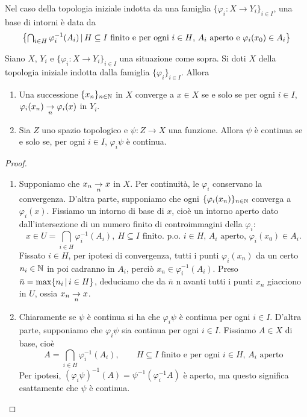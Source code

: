 Nel caso della topologia iniziale indotta da una famiglia $\{\varphi_i : X \to Y_i\}_{i \in I}$, una base di intorni è data da
\begin{equation}
\label{eq:neigh_basis}
	\left\{ {\textstyle \bigcap_{i \in H} \varphi_i^{-1}(A_i)} \suchthat \text{$H \subseteq I$ finito e per ogni $i \in H$, $A_i$ aperto e $\varphi_i(x_0) \in A_i$} \right\}
\end{equation}

\begin{theorem}
\label{th:weak_conv_and_cont}
	Siano $X$, $Y_i$ e $\{\varphi_i : X \to Y_i\}_{i \in I}$ una situazione come sopra. Si doti $X$ della topologia iniziale indotta dalla famiglia $\{\varphi_i\}_{i \in I}$.
	Allora
	\begin{enumerate}
		\item Una successione $\{x_n\}_{n \in \N}$ in $X$ converge a $x \in X$ se e solo se per ogni $i \in I$, $\varphi_i(x_n) \conv[n] \varphi_i(x)$ in $Y_i$.
		\item Sia $Z$ uno spazio topologico e $\psi : Z \to X$ una funzione.
		Allora $\psi$ è continua se e solo se, per ogni $i \in I$, $\varphi_i\psi$ è continua.
	\end{enumerate}
\end{theorem}
\begin{proof}
	\leavevmode
	\begin{enumerate}
		\item Supponiamo che $x_n \conv[n] x$ in $X$. Per continuità, le $\varphi_i$ conservano la convergenza. D'altra parte, supponiamo che ogni $\{\varphi_i(x_n)\}_{n \in \N}$ converga a $\varphi_i(x)$. Fissiamo un intorno di base di $x$, cioè un intorno aperto dato dall'intersezione di un numero finito di controimmagini della $\varphi_i$:
		\begin{equation*}
			x \in U=\bigcap_{i \in H} \varphi_i^{-1}(A_i), \ \text{$H \subseteq I$ finito. p.o. $i \in H$, $A_i$ aperto, $\varphi_i(x_0) \in A_i$}.
		\end{equation*}
		Fissato $i \in H$, per ipotesi di convergenza, tutti i punti $\varphi_i(x_n)$ da un certo $n_i \in \N$ in poi cadranno in $A_i$, perciò $x_n \in \varphi_i^{-1}(A_i)$. Preso $\bar n = \max \{n_i \suchthat i \in H\}$, deduciamo che da $\bar n$ n avanti tutti i punti $x_n$ giacciono in $U$, ossia $x_n \conv[n] x$.
		\item Chiaramente se $\psi$ è continua si ha che $\varphi_i \psi$ è continua per ogni $i \in I$. D'altra parte, supponiamo che $\varphi_i \psi$ sia continua per ogni $i \in I$. Fissiamo $A \in X$ di base, cioè
		\begin{equation*}
			A = \bigcap_{i \in H} \varphi_i^{-1}(A_i), \qquad \text{$H \subseteq I$ finito e per ogni $i \in H$, $A_i$ aperto}
		\end{equation*}
		Per ipotesi, $(\varphi_i \psi)^{-1}(A) = \psi^{-1}(\varphi_i^{-1}A)$ è aperto, ma questo significa esattamente che $\psi$ è continua.
	\end{enumerate}
\end{proof}


